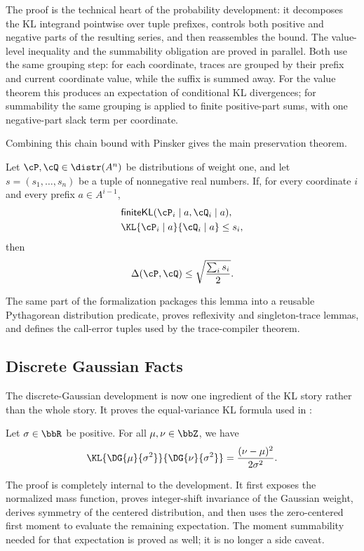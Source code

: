 The proof is the technical heart of the probability development: it decomposes the KL integrand pointwise over tuple prefixes, controls both positive and negative parts of the resulting series, and then reassembles the bound.
The value-level inequality and the summability obligation are proved in parallel.
Both use the same grouping step: for each coordinate, traces are grouped by their prefix and current coordinate value, while the suffix is summed away.
For the value theorem this produces an expectation of conditional KL divergences; for summability the same grouping is applied to finite positive-part sums, with one negative-part slack term per coordinate.

Combining this chain bound with Pinsker gives the main preservation theorem.
\begin{lemma}
\label{lem:verified-pythagorean-preservation}
Let $\cP,\cQ\in\distr(A^n)$ be distributions of weight one, and let
$s=(s_1,\ldots,s_n)$ be a tuple of nonnegative real numbers.
If, for every coordinate $i$ and every prefix $a\in A^{i-1}$,
\begin{align*}
  &\mathsf{finiteKL}(\cP_i\mid a,\cQ_i\mid a),\\
  &\KL{\cP_i\mid a}{\cQ_i\mid a}\leq s_i,
\end{align*}
then
\[
  \Delta(\cP,\cQ)
  \leq
  \sqrt{\frac{\sum_i s_i}{2}}.
\]
\end{lemma}
The same part of the formalization packages this lemma into a reusable Pythagorean distribution predicate, proves reflexivity and singleton-trace lemmas, and defines the call-error tuples used by the trace-compiler theorem.

\subsection{Discrete Gaussian Facts}

The discrete-Gaussian development is now one ingredient of the KL story rather than the whole story.
It proves the equal-variance KL formula used in :
\begin{lemma}
\label{lem:dg-kl}
Let $\sigma\in\bbR$ be positive.
For all $\mu, \nu\in\bbZ$, we have
\[
  \KL{\DG{\mu}{\sigma^2}}{\DG{\nu}{\sigma^2}}
  =
  \frac{(\nu-\mu)^2}{2\sigma^2}.
\]
\end{lemma}
The proof is completely internal to the development.
It first exposes the normalized mass function, proves integer-shift invariance of the Gaussian weight, derives symmetry of the centered distribution, and then uses the zero-centered first moment to evaluate the remaining expectation.
The moment summability needed for that expectation is proved as well; it is no longer a side caveat.

